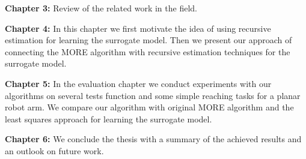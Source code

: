 \textbf{Chapter 3:} Review of the related work in the field.

\textbf{Chapter 4:} In this chapter we first motivate the idea of
using recursive estimation for learning the surrogate model.
Then we present our approach of connecting
the MORE algorithm with recursive estimation techniques for the
surrogate model. 

\textbf{Chapter 5:} In the evaluation chapter we conduct experiments
with our algorithms on several tests function and some simple reaching tasks
for a planar robot arm. We compare our algorithm with original MORE algorithm
and the least squares approach for learning the surrogate model.

\textbf{Chapter 6:} We conclude the thesis with a summary of
the achieved results and an outlook on future work.